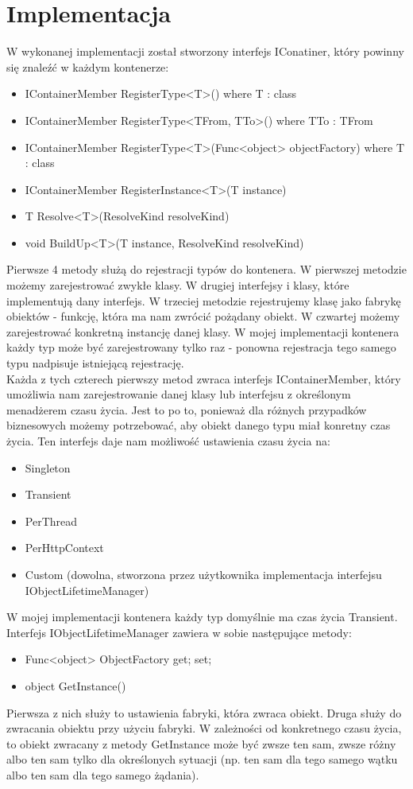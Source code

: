 \documentclass[12pt]{article}
\begin{document}
\section{Implementacja}
W wykonanej implementacji został stworzony interfejs IConatiner, który powinny się znaleźć w każdym kontenerze:
\begin{itemize}
	\item IContainerMember RegisterType<T>() where T : class
	\item IContainerMember RegisterType<TFrom, TTo>() where TTo : TFrom
	\item IContainerMember RegisterType<T>(Func<object> objectFactory) where T : class
	\item IContainerMember RegisterInstance<T>(T instance)
	\item T Resolve<T>(ResolveKind resolveKind)
	\item void BuildUp<T>(T instance, ResolveKind resolveKind)
\end{itemize}
Pierwsze 4 metody służą do rejestracji typów do kontenera. W pierwszej metodzie możemy zarejestrować zwykłe klasy. W drugiej interfejsy i klasy, które implementują dany interfejs. W trzeciej metodzie rejestrujemy klasę jako fabrykę obiektów - funkcję, która ma nam zwrócić pożądany obiekt. W czwartej możemy zarejestrować konkretną instancję danej klasy. W mojej implementacji kontenera każdy typ może być zarejestrowany tylko raz - ponowna rejestracja tego samego typu nadpisuje istniejącą rejestrację.\\
Każda z tych czterech pierwszy metod zwraca interfejs IContainerMember, który umożliwia nam zarejestrowanie danej klasy lub interfejsu z określonym menadżerem czasu życia. Jest to po to, ponieważ dla różnych przypadków biznesowych możemy potrzebować, aby obiekt danego typu miał konretny czas życia. Ten interfejs daje nam możliwość ustawienia czasu życia na:
\begin{itemize}
	\item Singleton
	\item Transient
	\item PerThread
	\item PerHttpContext
	\item Custom (dowolna, stworzona przez użytkownika implementacja interfejsu IObjectLifetimeManager)
\end{itemize}
W mojej implementacji kontenera każdy typ domyślnie ma czas życia Transient.\\
Interfejs IObjectLifetimeManager zawiera w sobie następujące metody:
\begin{itemize}
	\item  Func<object> ObjectFactory { get; set; }
	\item object GetInstance()
\end{itemize}
Pierwsza z nich służy to ustawienia fabryki, która zwraca obiekt. Druga służy do zwracania obiektu przy użyciu fabryki. W zależności od konkretnego czasu życia, to obiekt zwracany z metody GetInstance może być zwsze ten sam, zwsze różny albo ten sam tylko dla określonych sytuacji (np. ten sam dla tego samego wątku albo ten sam dla tego samego żądania).\\
\end{document}
